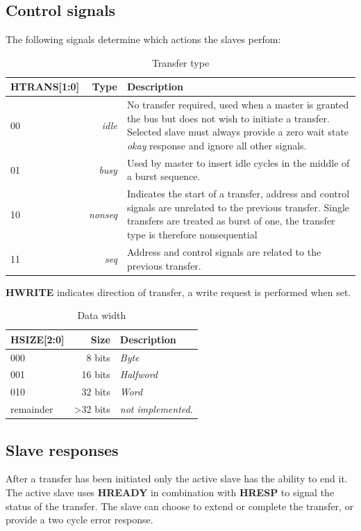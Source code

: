\newpage
\subsection{Control signals}
The following signals determine which actions the slaves perfom:
\begin{table}[hbt]
  \label{tab:htrans}
  \begin{tabular}{|p{28mm}|r|p{10cm}|} 
  \hline
  \textbf{HTRANS[1:0]} & \textbf{Type} & \textbf{Description} \\
    \hline
  00 & \textit{idle} & No transfer required, used when a master is granted the bus but does not wish to initiate a transfer. Selected slave must always provide a zero wait state \textit{okay} response and ignore all other signals.\\
    \hline
  01 & \textit{busy} & Used by master to insert idle cycles in the middle of a burst sequence. \\
    \hline
  10 & \textit{nonseq} & Indicates the start of a transfer, address and control signals are unrelated to the previous transfer. Single transfers are treated as burst of one, the transfer type is therefore nonsequential\\
    \hline
  11 & \textit{seq} & Address and control signals are related to the previous transfer.\\
\hline
  \end{tabular}
\caption{Transfer type}
\end{table}

\textbf{HWRITE} indicates direction of transfer, a write request is performed when set.

\begin{table}[hbt]
  \label{tab:hsize}
  \begin{tabular}{|p{25mm}|r|p{10cm}|} 
  \hline
  \textbf{HSIZE[2:0]} & \textbf{Size} & \textbf{Description} \\
    \hline
  000 & 8 bits & \textit{Byte}\\
    \hline
  001 & 16 bits & \textit{Halfword} \\
    \hline
  010 & 32 bits & \textit{Word}\\
    \hline
  remainder & >32 bits & \textit{not implemented}.\\
\hline
  \end{tabular}
\caption{Data width}
\end{table}

\newpage

\subsection{Slave responses}
\label{subsec:slvresp}
After a transfer has been initiated only the active slave has the ability to end it. The active slave uses \textbf{HREADY} in combination with \textbf{HRESP} to signal the status of the transfer. The slave can choose to extend or complete the transfer, or provide a two cycle error response. 

